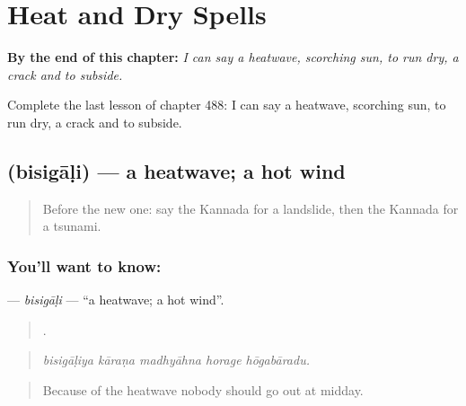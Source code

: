 
\chapter{Heat and Dry Spells}
\label{ch:ka-heat-and-dry-spells}

\begin{chapteropening}
\textbf{By the end of this chapter:} \emph{I can say a heatwave, scorching sun, to run dry, a crack and to subside.}

Complete the last lesson of chapter 488: I can say a heatwave, scorching sun, to run dry, a crack and to subside.
\end{chapteropening}

\section[\texorpdfstring{\kn{ಬಿಸಿಗಾಳಿ} (bisigāḷi)}{ಬಿಸಿಗಾಳಿ (bisigāḷi)}]{ (bisigāḷi) — a heatwave; a hot wind}

\label{lesson:KA-C488-bisigali}



\begin{quote}
Before the new one: say the Kannada for a landslide, then the Kannada for a tsunami.
\end{quote}

\subsection*{You'll want to know: }
\textbf{} — \emph{bisigāḷi} — \textquotedblleft{}a heatwave; a hot wind\textquotedblright{}.

\begin{quote}
    .
\end{quote}

\begin{quote}
\emph{bisigāḷiya kāraṇa madhyāhna horage hōgabāradu.}
\end{quote}

\begin{quote}
Because of the heatwave nobody should go out at midday.
\end{quote}

